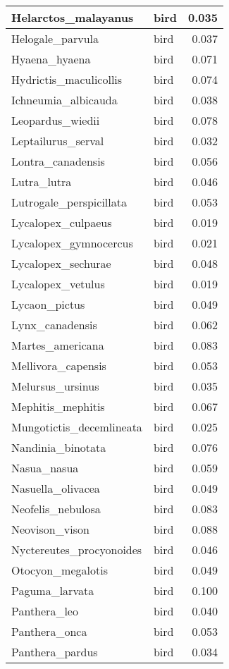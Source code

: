 \begin{table}
\begin{tabular}[t]{l|l|r}
\hline
Helarctos\_malayanus & bird & 0.035\\
\hline
Helogale\_parvula & bird & 0.037\\
\hline
Hyaena\_hyaena & bird & 0.071\\
\hline
Hydrictis\_maculicollis & bird & 0.074\\
\hline
Ichneumia\_albicauda & bird & 0.038\\
\hline
Leopardus\_wiedii & bird & 0.078\\
\hline
Leptailurus\_serval & bird & 0.032\\
\hline
Lontra\_canadensis & bird & 0.056\\
\hline
Lutra\_lutra & bird & 0.046\\
\hline
Lutrogale\_perspicillata & bird & 0.053\\
\hline
Lycalopex\_culpaeus & bird & 0.019\\
\hline
Lycalopex\_gymnocercus & bird & 0.021\\
\hline
Lycalopex\_sechurae & bird & 0.048\\
\hline
Lycalopex\_vetulus & bird & 0.019\\
\hline
Lycaon\_pictus & bird & 0.049\\
\hline
Lynx\_canadensis & bird & 0.062\\
\hline
Martes\_americana & bird & 0.083\\
\hline
Mellivora\_capensis & bird & 0.053\\
\hline
Melursus\_ursinus & bird & 0.035\\
\hline
Mephitis\_mephitis & bird & 0.067\\
\hline
Mungotictis\_decemlineata & bird & 0.025\\
\hline
Nandinia\_binotata & bird & 0.076\\
\hline
Nasua\_nasua & bird & 0.059\\
\hline
Nasuella\_olivacea & bird & 0.049\\
\hline
Neofelis\_nebulosa & bird & 0.083\\
\hline
Neovison\_vison & bird & 0.088\\
\hline
Nyctereutes\_procyonoides & bird & 0.046\\
\hline
Otocyon\_megalotis & bird & 0.049\\
\hline
Paguma\_larvata & bird & 0.100\\
\hline
Panthera\_leo & bird & 0.040\\
\hline
Panthera\_onca & bird & 0.053\\
\hline
Panthera\_pardus & bird & 0.034\\

\end{tabular}
\end{table}
